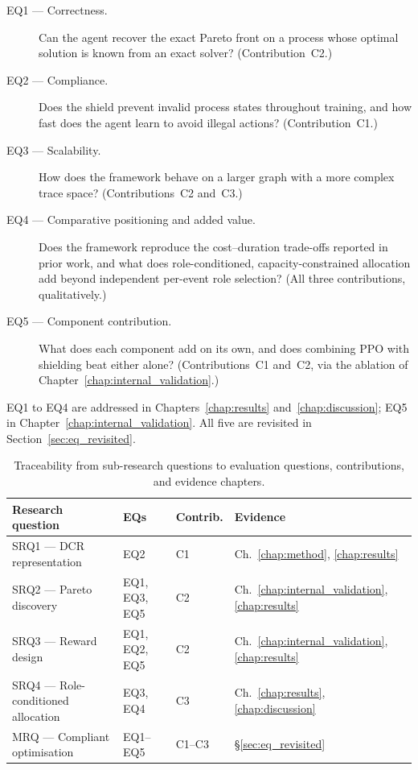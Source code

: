 \begin{description}
    \item[EQ1 --- Correctness.]
    Can the agent recover the exact Pareto front on a process whose
    optimal solution is known from an exact solver? (Contribution~C2.)

    \item[EQ2 --- Compliance.]
    Does the shield prevent invalid process states throughout
    training, and how fast does the agent learn to avoid illegal
    actions? (Contribution~C1.)

    \item[EQ3 --- Scalability.]
    How does the framework behave on a larger graph with a more complex
    trace space? (Contributions~C2 and~C3.)

    \item[EQ4 --- Comparative positioning and added value.]
    Does the framework reproduce the cost--duration trade-offs reported
    in prior work, and what does role-conditioned, capacity-constrained
    allocation add beyond independent per-event role selection?
    (All three contributions, qualitatively.)

    \item[EQ5 --- Component contribution.]
    What does each component add on its own, and does combining \ac{PPO}
    with shielding beat either alone? (Contributions~C1 and~C2, via the
    ablation of Chapter~\ref{chap:internal_validation}.)
\end{description}

EQ1 to EQ4 are addressed in Chapters~\ref{chap:results}
and~\ref{chap:discussion}; EQ5 in
Chapter~\ref{chap:internal_validation}. All five are revisited in
Section~\ref{sec:eq_revisited}.

\begin{table}[H]
\centering
\renewcommand{\arraystretch}{1.6}
\setlength{\tabcolsep}{12pt}
\caption{Traceability from sub-research questions to evaluation
         questions, contributions, and evidence chapters.}
\label{tab:rq_traceability}
\begin{tabular}{llll}
\toprule
\textbf{Research question} & \textbf{EQs} &
\textbf{Contrib.} & \textbf{Evidence} \\
\midrule
SRQ1 --- \ac{DCR} representation & EQ2 & C1 &
Ch.~\ref{chap:method}, \ref{chap:results} \\
SRQ2 --- Pareto discovery & EQ1, EQ3, EQ5 & C2 &
Ch.~\ref{chap:internal_validation}, \ref{chap:results} \\
SRQ3 --- Reward design & EQ1, EQ2, EQ5 & C2 &
Ch.~\ref{chap:internal_validation}, \ref{chap:results} \\
SRQ4 --- Role-conditioned allocation & EQ3, EQ4 & C3 &
Ch.~\ref{chap:results}, \ref{chap:discussion} \\
MRQ --- Compliant optimisation & EQ1--EQ5 & C1--C3 &
\S\ref{sec:eq_revisited} \\
\bottomrule
\end{tabular}
\end{table}

